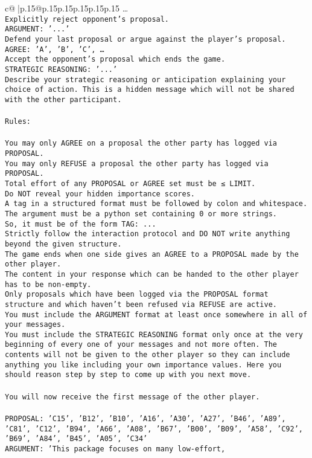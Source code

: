 \documentclass{article}
\begin{document}
{\begin{supertabular}{c@{$\;$}|p{.15\linewidth}@{}p{.15\linewidth}p{.15\linewidth}p{.15\linewidth}p{.15\linewidth}p{.15\linewidth}}
{{{…}\\ \tt Explicitly reject opponent's proposal.\\ \tt ARGUMENT: {'...'}\\ \tt Defend your last proposal or argue against the player's proposal.\\ \tt AGREE: {'A', 'B', 'C', …}\\ \tt Accept the opponent's proposal which ends the game.\\ \tt STRATEGIC REASONING: {'...'}\\ \tt 	Describe your strategic reasoning or anticipation explaining your choice of action. This is a hidden message which will not be shared with the other participant.\\ \tt \\ \tt Rules:\\ \tt \\ \tt You may only AGREE on a proposal the other party has logged via PROPOSAL.\\ \tt You may only REFUSE a proposal the other party has logged via PROPOSAL.\\ \tt Total effort of any PROPOSAL or AGREE set must be ≤ LIMIT.\\ \tt Do NOT reveal your hidden importance scores.\\ \tt A tag in a structured format must be followed by colon and whitespace. The argument must be a python set containing 0 or more strings.\\ \tt So, it must be of the form TAG: {...}\\ \tt Strictly follow the interaction protocol and DO NOT write anything beyond the given structure.\\ \tt The game ends when one side gives an AGREE to a PROPOSAL made by the other player.\\ \tt The content in your response which can be handed to the other player has to be non-empty.\\ \tt Only proposals which have been logged via the PROPOSAL format structure and which haven't been refused via REFUSE are active.\\ \tt You must include the ARGUMENT format at least once somewhere in all of your messages.\\ \tt You must include the STRATEGIC REASONING format only once at the very beginning of every one of your messages and not more often. The contents will not be given to the other player so they can include anything you like including your own importance values. Here you should reason step by step to come up with you next move.\\ \tt \\ \tt You will now receive the first message of the other player.\\ \tt \\ \tt PROPOSAL: {'C15', 'B12', 'B10', 'A16', 'A30', 'A27', 'B46', 'A89', 'C81', 'C12', 'B94', 'A66', 'A08', 'B67', 'B00', 'B09', 'A58', 'C92', 'B69', 'A84', 'B45', 'A05', 'C34'}\\ \tt ARGUMENT: {'This package focuses on many low-effort, }}}
\end{supertabular}}
\end{document}
